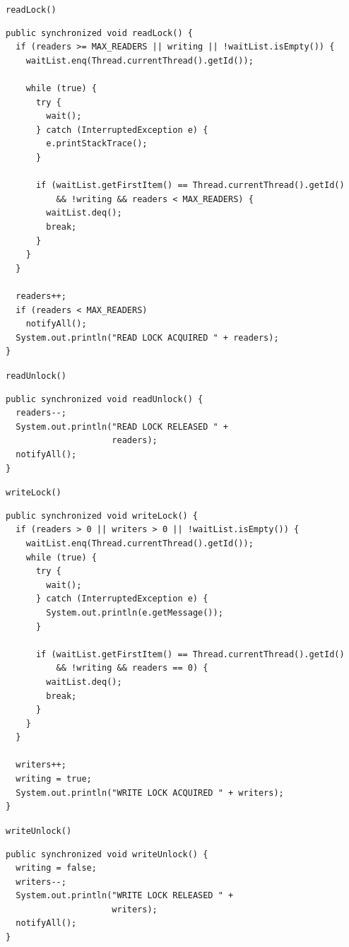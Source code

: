 \begin{frame}[fragile]{\lstinline!readLock()!}
\begin{lstlisting}[basicstyle=\fontsize{7}{9}\selectfont\ttfamily]
public synchronized void readLock() {
  if (readers >= MAX_READERS || writing || !waitList.isEmpty()) {
    waitList.enq(Thread.currentThread().getId());

    while (true) {
      try {
        wait();
      } catch (InterruptedException e) {
        e.printStackTrace();
      }

      if (waitList.getFirstItem() == Thread.currentThread().getId()
          && !writing && readers < MAX_READERS) {
        waitList.deq();
        break;
      }
    }
  }

  readers++;
  if (readers < MAX_READERS)
    notifyAll();
  System.out.println("READ LOCK ACQUIRED " + readers);
}
\end{lstlisting}
\end{frame}

\begin{frame}[fragile]{\lstinline!readUnlock()!}
\begin{lstlisting}
public synchronized void readUnlock() {
  readers--;
  System.out.println("READ LOCK RELEASED " + 
                     readers);
  notifyAll();
}
\end{lstlisting}
\end{frame}

\begin{frame}[fragile]{\lstinline!writeLock()!}
\begin{lstlisting}[basicstyle=\fontsize{7}{9}\selectfont\ttfamily]
public synchronized void writeLock() {
  if (readers > 0 || writers > 0 || !waitList.isEmpty()) {
    waitList.enq(Thread.currentThread().getId());
    while (true) {
      try {
        wait();
      } catch (InterruptedException e) {
        System.out.println(e.getMessage());
      }

      if (waitList.getFirstItem() == Thread.currentThread().getId()
          && !writing && readers == 0) {
        waitList.deq();
        break;
      }
    }
  }
  
  writers++;
  writing = true;
  System.out.println("WRITE LOCK ACQUIRED " + writers);
}
\end{lstlisting}
\end{frame}

\begin{frame}[fragile]{\lstinline!writeUnlock()!}
\begin{lstlisting}
public synchronized void writeUnlock() {
  writing = false;
  writers--;    
  System.out.println("WRITE LOCK RELEASED " + 
                     writers);
  notifyAll();
}
\end{lstlisting}
\end{frame}


